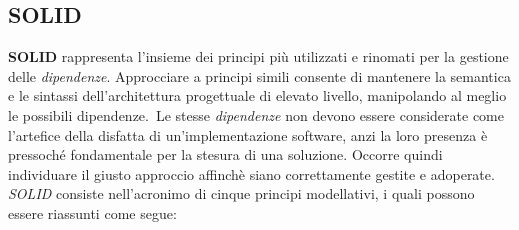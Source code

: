 \documentclass{article}
\begin{document}
\subsection*{SOLID}
\large
\textbf{SOLID} rappresenta l'insieme dei principi più utilizzati e rinomati per la gestione delle \textit{dipendenze}. Approcciare a principi simili consente di mantenere la semantica e le sintassi dell'architettura progettuale di elevato livello, manipolando al meglio le possibili dipendenze.\ Le stesse \textit{dipendenze} non devono essere considerate come l'artefice della disfatta di un'implementazione software, anzi la loro presenza è pressoché fondamentale per la stesura di una soluzione. Occorre quindi individuare il giusto approccio affinchè siano correttamente gestite e adoperate.\vspace*{14pt}\\
\textit{SOLID} consiste nell'acronimo di cinque principi modellativi, i quali possono essere riassunti come segue:
\end{document}
